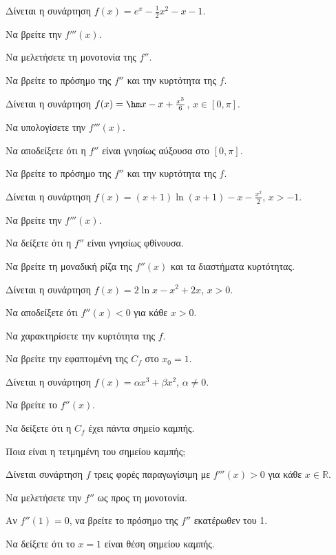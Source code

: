 \documentclass[11pt,a4paper,modern]{FFExercises}
\begin{document}
\askhsh
Δίνεται η συνάρτηση $f(x) = e^x - \frac{1}{2}x^2 - x - 1$.
\begin{alist}
    \item Να βρείτε την $f'''(x)$.
    \item Να μελετήσετε τη μονοτονία της $f''$.
    \item Να βρείτε το πρόσημο της $f''$ και την κυρτότητα της $f$.
\end{alist}

\askhsh
Δίνεται η συνάρτηση $f(x) = \hm x - x + \frac{x^3}{6}$, $x \in [0, \pi]$.
\begin{alist}
    \item Να υπολογίσετε την $f'''(x)$.
    \item Να αποδείξετε ότι η $f''$ είναι γνησίως αύξουσα στο $[0, \pi]$.
    \item Να βρείτε το πρόσημο της $f''$ και την κυρτότητα της $f$.
\end{alist}

\askhsh
Δίνεται η συνάρτηση $f(x) = (x+1)\ln(x+1) - x - \frac{x^2}{2}$, $x > -1$.
\begin{alist}
    \item Να βρείτε την $f'''(x)$.
    \item Να δείξετε ότι η $f''$ είναι γνησίως φθίνουσα.
    \item Να βρείτε τη μοναδική ρίζα της $f''(x)$ και τα διαστήματα κυρτότητας.
\end{alist}

\askhsh
Δίνεται η συνάρτηση $f(x) = 2\ln x - x^2 + 2x$, $x>0$.
\begin{alist}
    \item Να αποδείξετε ότι $f''(x) < 0$ για κάθε $x>0$.
    \item Να χαρακτηρίσετε την κυρτότητα της $f$.
    \item Να βρείτε την εφαπτομένη της $C_f$ στο $x_0=1$.
\end{alist}

\askhsh
Δίνεται η συνάρτηση $f(x) = \alpha x^3 + \beta x^2$, $\alpha \ne 0$.
\begin{alist}
    \item Να βρείτε το $f''(x)$.
    \item Να δείξετε ότι η $C_f$ έχει πάντα σημείο καμπής.
    \item Ποια είναι η τετμημένη του σημείου καμπής;
\end{alist}

\askhsh
Δίνεται συνάρτηση $f$ τρεις φορές παραγωγίσιμη με $f'''(x) > 0$ για κάθε $x \in \mathbb{R}$.
\begin{alist}
    \item Να μελετήσετε την $f''$ ως προς τη μονοτονία.
    \item Αν $f''(1)=0$, να βρείτε το πρόσημο της $f''$ εκατέρωθεν του 1.
    \item Να δείξετε ότι το $x=1$ είναι θέση σημείου καμπής.
\end{alist}
\end{document}
